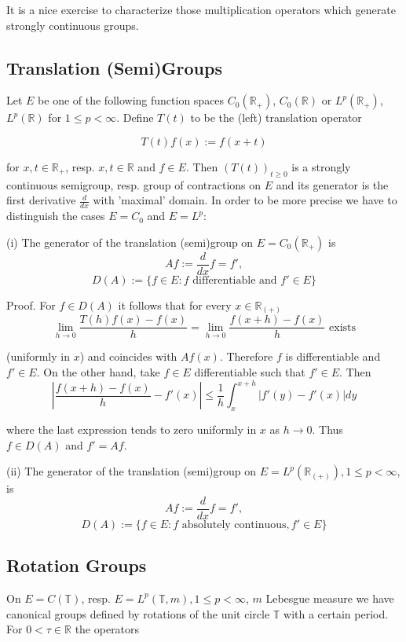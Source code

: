 \documentclass{article}
\begin{document}
It is a nice exercise to characterize those multiplication operators which generate strongly continuous groups.

\subsection{Translation (Semi)Groups}
Let $E$ be one of the following function spaces $C_0(\mathbb{R}_+)$, $C_0(\mathbb{R})$ or $L^p(\mathbb{R}_+)$, $L^p(\mathbb{R})$ for $1 \leq p < \infty$.
Define $T(t)$ to be the (left) translation operator

\[
T(t)f(x) := f(x+t)
\]

for $x,t \in \mathbb{R}_+$, resp. $x,t \in \mathbb{R}$ and $f \in E$.
Then $(T(t))_{t \geq 0}$ is a strongly continuous semigroup, resp. group of contractions on $E$ and its generator is the first derivative $\frac{d}{dx}$ with 'maximal' domain.
In order to be more precise we have to distinguish the cases $E=C_0$ and $E=L^p$:

(i) The generator of the translation (semi)group on $E=C_0(\mathbb{R}_+)$ is
\[
Af := \frac{d}{dx}f = f',
\]
\[
D(A) := \{f \in E: f \text{ differentiable and } f' \in E\}
\]

Proof. For $f \in D(A)$ it follows that for every $x \in \mathbb{R}_{(+)}$
\[
\lim_{h \to 0} \frac{T(h)f(x)-f(x)}{h} = \lim_{h \to 0} \frac{f(x+h)-f(x)}{h} \text{ exists}
\]

(uniformly in $x$) and coincides with $Af(x)$.
Therefore $f$ is differentiable and $f' \in E$.
On the other hand, take $f \in E$ differentiable such that $f' \in E$.
Then
\[
\left|\frac{f(x+h)-f(x)}{h}-f'(x)\right| \leq \frac{1}{h} \int_{x}^{x+h}|f'(y)-f'(x)| dy
\]

where the last expression tends to zero uniformly in $x$ as $h \to 0$.
Thus $f \in D(A)$ and $f' = Af$.

(ii) The generator of the translation (semi)group on $E=L^p(\mathbb{R}_{(+)}), 1 \leq p < \infty$, is
\[
Af := \frac{d}{dx}f = f',
\]
\[
D(A) := \{f \in E: f \text{ absolutely continuous}, f' \in E\}
\]

\subsection{Rotation Groups}
On $E=C(\mathbb{T})$, resp. $E=L^p(\mathbb{T},m), 1 \leq p < \infty$, $m$ Lebesgue measure we have canonical groups defined by rotations of the unit circle $\mathbb{T}$ with a certain period.
For $0 < \tau \in \mathbb{R}$ the operators
\end{document}
